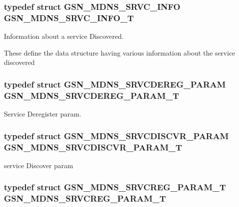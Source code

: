 \hypertarget{a00668_gaab0d47b6c1928b684129f17c0fbd1292}{
\subsubsection[{GSN\_\-MDNS\_\-SRVC\_\-INFO\_\-T}]{\setlength{\rightskip}{0pt plus 5cm}typedef struct {\bf GSN\_\-MDNS\_\-SRVC\_\-INFO} {\bf GSN\_\-MDNS\_\-SRVC\_\-INFO\_\-T}}}
\label{a00668_gaab0d47b6c1928b684129f17c0fbd1292}


Information about a service Discovered. 

These define the data structure having various information about the service discovered \hypertarget{a00668_ga1ec6492d157706d2baaf53959c6558b8}{
\subsubsection[{GSN\_\-MDNS\_\-SRVCDEREG\_\-PARAM\_\-T}]{\setlength{\rightskip}{0pt plus 5cm}typedef struct {\bf GSN\_\-MDNS\_\-SRVCDEREG\_\-PARAM} {\bf GSN\_\-MDNS\_\-SRVCDEREG\_\-PARAM\_\-T}}}
\label{a00668_ga1ec6492d157706d2baaf53959c6558b8}


Service Deregister param. 

\hypertarget{a00668_gae85953b9de0c8db5521e84d7a91149e1}{
\subsubsection[{GSN\_\-MDNS\_\-SRVCDISCVR\_\-PARAM\_\-T}]{\setlength{\rightskip}{0pt plus 5cm}typedef struct {\bf GSN\_\-MDNS\_\-SRVCDISCVR\_\-PARAM} {\bf GSN\_\-MDNS\_\-SRVCDISCVR\_\-PARAM\_\-T}}}
\label{a00668_gae85953b9de0c8db5521e84d7a91149e1}


service Discover param 

\hypertarget{a00668_ga20024e1aacee7fa459e6be0aaf450a16}{
\subsubsection[{GSN\_\-MDNS\_\-SRVCREG\_\-PARAM\_\-T}]{\setlength{\rightskip}{0pt plus 5cm}typedef struct {\bf GSN\_\-MDNS\_\-SRVCREG\_\-PARAM\_\-T} {\bf GSN\_\-MDNS\_\-SRVCREG\_\-PARAM\_\-T}}}
\label{a00668_ga20024e1aacee7fa459e6be0aaf450a16}


